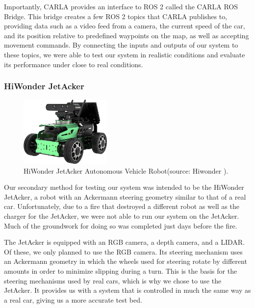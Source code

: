 \documentclass[titlepage, draft]{article}
\begin{document}
{Importantly, CARLA provides an interface to ROS 2 called the CARLA ROS Bridge. This bridge creates a few ROS 2 topics that CARLA publishes to, providing data such as a video feed from a camera, the current speed of the car, and its position relative to predefined waypoints on the map, as well as accepting movement commands. By connecting the inputs and outputs of our system to these topics, we were able to test our system in realistic conditions and evaluate its performance under close to real conditions.

\subsubsection{HiWonder JetAcker}

\begin{figure}
	\centering
	\includegraphics*[width=0.4\textwidth]{JetAcker1}
	\caption{HiWonder JetAcker Autonomous Vehicle Robot(source: Hiwonder \cite{jetackerhiwonder}).}
	\label{fig:JetAcker}
\end{figure}

Our secondary method for testing our system was intended to be the HiWonder JetAcker, a robot with an Ackermann steering geometry similar to that of a real car. Unfortunately, due to a fire that destroyed a different robot as well as the charger for the JetAcker, we were not able to run our system on the JetAcker. Much of the groundwork for doing so was completed just days before the fire.

The JetAcker is equipped with an RGB camera, a depth camera, and a LIDAR. Of these, we only planned to use the RGB camera. Its steering mechanism uses an Ackermann geometry in which the wheels used for steering rotate by different amounts in order to minimize slipping during a turn. This is the basis for the steering mechanisms used by real cars, which is why we chose to use the JetAcker. It provides us with a system that is controlled in much the same way as a real car, giving us a more accurate test bed.

}
\end{document}
